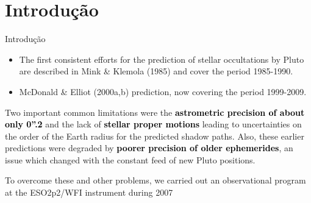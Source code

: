 \section{Introdução}
\begin{frame}[c]{Introdução}{}

\begin{itemize}
	\item The first consistent efforts for the prediction of stellar occultations by Pluto are described in Mink \& Klemola (1985) and cover the period 1985-1990.
	\item McDonald \& Elliot (2000a,b) prediction, now covering the period 1999-2009.
\end{itemize}
\pause
\begin{alertblock}{}
	Two important common limitations were the  \textcolor{black}{\textbf{astrometric precision of about only 0''.2}} and the lack of \textcolor{black}{\textbf{stellar proper motions}} leading to uncertainties on the order of the Earth radius for the predicted shadow paths. Also, these earlier predictions were degraded by \textcolor{black}{\textbf{poorer precision of older ephemerides}}, an issue which changed with the constant feed of new Pluto positions.
\end{alertblock}	
\pause
	\begin{block}{}
		To overcome these and other problems, we carried out an observational program at the ESO2p2/WFI instrument during 2007
	\end{block}
\end{frame}



